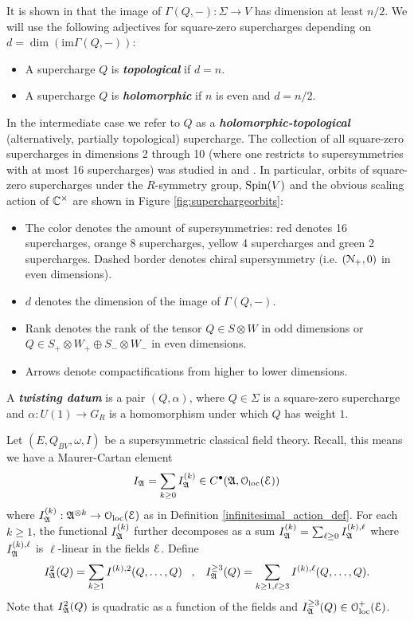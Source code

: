 \documentclass[10pt, oneside]{article}
\newcommand{\defterm}[1]{\textbf{\emph{#1}}}
\begin{document}
It is shown in \cite[Proposition 3.25]{ElliottSafronov} that the image of $\Gamma(Q, -)\colon \Sigma\rightarrow V$ has dimension at least $n/2$. We will use the following adjectives for square-zero supercharges depending on $d=\dim(\mathrm{im}\Gamma(Q, -))$:
\begin{itemize}
\item A supercharge $Q$ is \defterm{topological} if $d = n$.

\item A supercharge $Q$ is \defterm{holomorphic} if $n$ is even and $d=n/2$.
\end{itemize}

In the intermediate case we refer to $Q$ as a \defterm{holomorphic-topological} (alternatively, partially topological) supercharge. The collection of all square-zero supercharges in dimensions 2 through 10 (where one restricts to supersymmetries with at most 16 supercharges) was studied in \cite{ElliottSafronov} and \cite{EagerSaberiWalcher}. In particular, orbits of square-zero supercharges under the $R$-symmetry group, $\mathrm{Spin}(V)$ and the obvious scaling action of $\mathbb C^\times$ are shown in Figure \ref{fig:superchargeorbits}:
\begin{itemize}
\item The color denotes the amount of supersymmetries: red denotes 16 supercharges, orange 8 supercharges, yellow 4 supercharges and green 2 supercharges. Dashed border denotes chiral supersymmetry (i.e. $(\mathcal N_+, 0)$ in even dimensions).

\item $d$ denotes the dimension of the image of $\Gamma(Q, -)$.

\item Rank denotes the rank of the tensor $Q\in S\otimes W$ in odd dimensions or $Q\in S_+\otimes W_+\oplus S_-\otimes W_-$ in even dimensions.

\item Arrows denote compactifications from higher to lower dimensions.
\end{itemize}

\begin{definition}
A \defterm{twisting datum} is a pair $(Q, \alpha)$, where $Q\in\Sigma$ is a square-zero supercharge and $\alpha\colon U(1)\rightarrow G_R$ is a homomorphism under which $Q$ has weight $1$.
\end{definition}

Let $(E, Q_{BV}, \omega, I)$ be a supersymmetric classical field theory.
Recall, this means we have a Maurer-Cartan element 
\[
I_{\mathfrak A} = \sum_{k \geq 0} I_{\mathfrak A}^{(k)} \in C^\bullet(\mathfrak A, \mathcal{O}_{\rm loc}(\mathcal E))
\]
where $I_{\mathfrak A}^{(k)} : \mathfrak A^{\otimes k} \to \mathcal{O}_{\rm loc}(\mathcal E)$ as in Definition \ref{infinitesimal_action_def}. 
For each $k \geq 1$, the functional $I_{\mathfrak A}^{(k)}$ further decomposes as a sum $I_{\mathfrak A}^{(k)} = \sum_{\ell \geq 0} I_\mathfrak A^{(k),\ell}$ where $I_\mathfrak A^{(k),\ell}$ is $\ell$-linear in the fields $\mathcal E$. 
Define
\[
I_{\mathfrak A}^2 (Q) = \sum_{k \geq 1} I^{(k),2} (Q, \ldots, Q) \;\;\; , \;\;\; I_{\mathfrak A}^{\geq 3} (Q) =  \sum_{k \geq 1, \ell \geq 3} I^{(k),\ell} (Q, \ldots, Q) .
\]
Note that $I_{\mathfrak A}^2 (Q)$ is quadratic as a function of the fields and $I_{\mathfrak A}^{\geq 3}(Q) \in \mathcal O_{\rm loc}^+(\mathcal E)$. 
\end{document}

